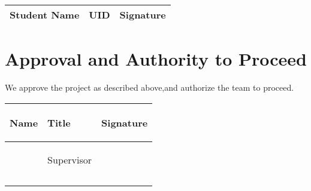 \documentclass{article}
\begin{document}
\begin{center}
\begin{tabular}{ |m{}|m{6em}|m{7em}| }
    \hline
    \textbf{Student Name} & \textbf{UID} & \textbf{Signature} \\
    \hline
\end{tabular}
\end{center}

\section*{Approval and Authority to Proceed}

We approve the project as described above,and authorize the team to proceed.


\begin{center}
\begin{tabular}{ |p{9em}|p{9em}|p{9em}| }
    \hline
    \begin{center}\textbf{Name}\end{center} & \begin{center}\textbf{Title}\end{center} & \begin{center}\textbf{Signature}\end{center} \\
    \hline
    &\begin{center}{Supervisor}\end{center}&\\
    \hline
    &&\\
    &&\\
    \hline
\end{tabular}
\end{center}
\end{document}

